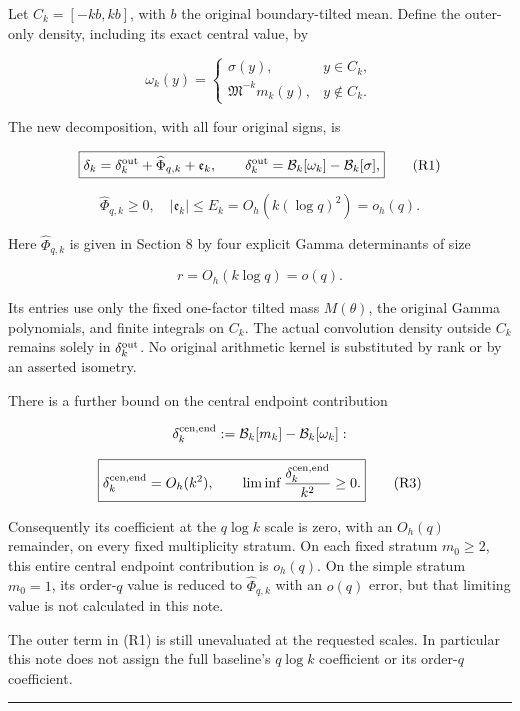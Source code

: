 \documentclass[11pt,a4paper]{article}
\begin{document}
Let \(C_k=[-kb,kb]\), with \(b\) the original boundary-tilted mean. Define the outer-only density, including its exact central value, by

\[
\omega_k(y)=
\begin{cases}\sigma(y),&y\in C_k,\\
\mathfrak M^{-k}m_k(y),&y\notin C_k.
\end{cases}
\]

The new decomposition, with all four original signs, is

\[
\boxed{\delta_k=\delta_k^{\rm out}+\widehat\Phi_{q,k}+\mathfrak e_k,
\qquad \delta_k^{\rm out}=\mathcal B_k[\omega_k]-\mathcal B_k[\sigma],}
\tag{R1}
\]

\[
\boxed{\widehat\Phi_{q,k}\ge0,\quad
|\mathfrak e_k|\le E_k=O_h(k(\log q)^2)=o_h(q).}
\tag{R2}
\]

Here \(\widehat\Phi_{q,k}\) is given in Section 8 by four explicit Gamma determinants of size

\[
r=O_h(k\log q)=o(q).
\]

Its entries use only the fixed one-factor tilted mass \(M(\theta)\), the original Gamma polynomials, and finite integrals on \(C_k\). The actual convolution density outside \(C_k\) remains solely in \(\delta_k^{\rm out}\). No original arithmetic kernel is substituted by rank or by an asserted isometry.

There is a further bound on the central endpoint contribution

\[
\delta_k^{\rm cen,end}:=\mathcal B_k[m_k]-\mathcal B_k[\omega_k]:
\]

\[
\boxed{\delta_k^{\rm cen,end}=O_h(k^2),\qquad
\liminf\frac{\delta_k^{\rm cen,end}}{k^2}\ge0.}
\tag{R3}
\]

Consequently its coefficient at the \(q\log k\) scale is zero, with an \(O_h(q)\) remainder, on every fixed multiplicity stratum. On each fixed stratum \(m_0\ge2\), this entire central endpoint contribution is \(o_h(q)\). On the simple stratum \(m_0=1\), its order-\(q\) value is reduced to \(\widehat\Phi_{q,k}\) with an \(o(q)\) error, but that limiting value is not calculated in this note.

The outer term in (R1) is still unevaluated at the requested scales. In particular this note does not assign the full baseline's \(q\log k\) coefficient or its order-\(q\) coefficient.

\begin{center}\rule{0.5\linewidth}{0.5pt}\end{center}
\end{document}
